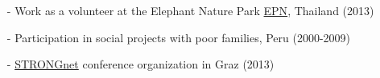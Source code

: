 \documentclass[a4paper, 10pt]{article}
\begin{document}
\vspace*{2mm}
\vspace*{-1mm}
\begin{itemize}
    \item[-] Work as a volunteer at the Elephant Nature Park 
          \href{http://www.elephantnaturepark.org/}{EPN}, Thailand (2013)\vspace*{-2mm}
    \item[-] Participation in social projects with poor families, Peru (2000-2009)
\end{itemize}

\vspace*{2mm}
\vspace*{-1mm}
\begin{itemize}
    \item[-] \href{http://143.50.247.55/STRONGnet2013/}{STRONGnet} 
          conference organization in Graz (2013)
\end{itemize}
\end{document}
